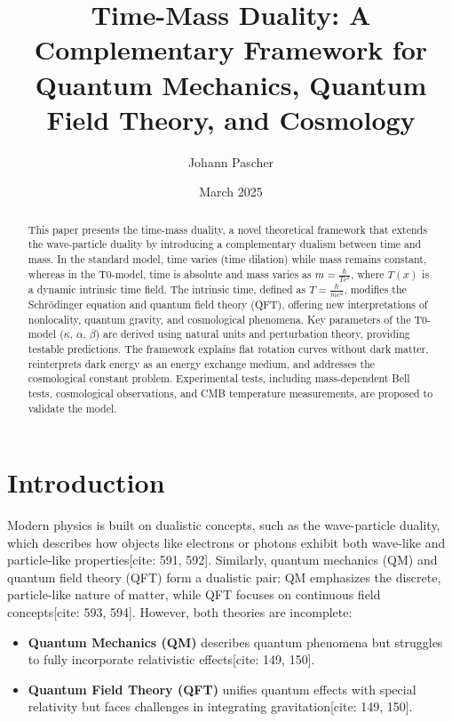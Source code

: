 \documentclass[a4paper,12pt]{article}
\theoremstyle{definition}
\theoremstyle{remark}
\begin{document}
	
	\title{Time-Mass Duality: A Complementary Framework for Quantum Mechanics, Quantum Field Theory, and Cosmology}
	\author{Johann Pascher}
	\date{March 2025}
	\maketitle
	
	\begin{abstract}
		This paper presents the time-mass duality, a novel theoretical framework that extends the wave-particle duality by introducing a complementary dualism between time and mass. In the standard model, time varies (time dilation) while mass remains constant, whereas in the T0-model, time is absolute and mass varies as \( m = \frac{\hbar}{T c^2} \), where \( T(x) \) is a dynamic intrinsic time field. The intrinsic time, defined as \( T = \frac{\hbar}{m c^2} \), modifies the Schrödinger equation and quantum field theory (QFT), offering new interpretations of nonlocality, quantum gravity, and cosmological phenomena. Key parameters of the T0-model (\(\kappa\), \(\alpha\), \(\beta\)) are derived using natural units and perturbation theory, providing testable predictions. The framework explains flat rotation curves without dark matter, reinterprets dark energy as an energy exchange medium, and addresses the cosmological constant problem. Experimental tests, including mass-dependent Bell tests, cosmological observations, and CMB temperature measurements, are proposed to validate the model.
	\end{abstract}
	
	\tableofcontents
	\newpage
	
	\section{Introduction}
	
	Modern physics is built on dualistic concepts, such as the wave-particle duality, which describes how objects like electrons or photons exhibit both wave-like and particle-like properties[cite: 591, 592]. Similarly, quantum mechanics (QM) and quantum field theory (QFT) form a dualistic pair: QM emphasizes the discrete, particle-like nature of matter, while QFT focuses on continuous field concepts[cite: 593, 594]. However, both theories are incomplete:
	
	\begin{itemize}
		\item \textbf{Quantum Mechanics (QM)} describes quantum phenomena but struggles to fully incorporate relativistic effects[cite: 149, 150].
		\item \textbf{Quantum Field Theory (QFT)} unifies quantum effects with special relativity but faces challenges in integrating gravitation[cite: 149, 150].
	\end{itemize}
	
\end{document}
